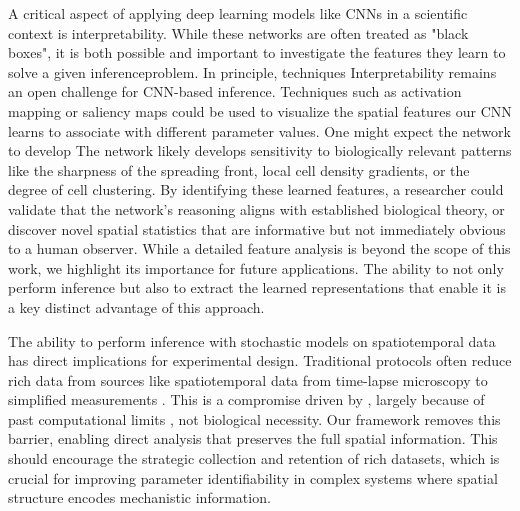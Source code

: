 \documentclass{article}
\providecommand{\DIFaddtex}[1]{{\protect\color{blue} \sf #1}} %
\providecommand{\DIFdeltex}[1]{{\protect\color{red} \scriptsize #1}} %
\providecommand{\DIFaddbegin}{} %
\providecommand{\DIFaddend}{} %
\providecommand{\DIFdelbegin}{} %
\providecommand{\DIFdelend}{} %
\providecommand{\DIFadd}[1]{\texorpdfstring{\DIFaddtex{#1}}{#1}} %
\providecommand{\DIFdel}[1]{\texorpdfstring{\DIFdeltex{#1}}{}} %
\newcommand{\DIFscaledelfig}{0.5}
\newlength{\DIFdelgraphicswidth} %
\newlength{\DIFdelgraphicsheight} %
\newcommand{\DIFaddincludegraphics}[2][]{{\color{blue}\fbox{\DIFOincludegraphics[#1]{#2}}}} %
\newcommand{\DIFdelincludegraphics}[2][]{%
\sbox{\DIFdelgraphicsbox}{\DIFOincludegraphics[#1]{#2}}%
\settoboxwidth{\DIFdelgraphicswidth}{\DIFdelgraphicsbox} %
\settoboxtotalheight{\DIFdelgraphicsheight}{\DIFdelgraphicsbox} %
\scalebox{\DIFscaledelfig}{%
\parbox[b]{\DIFdelgraphicswidth}{\usebox{\DIFdelgraphicsbox}\\[-\baselineskip] \rule{\DIFdelgraphicswidth}{0em}}\llap{\resizebox{\DIFdelgraphicswidth}{\DIFdelgraphicsheight}{%
\setlength{\unitlength}{\DIFdelgraphicswidth}%
\begin{picture}(1,1)%
\thicklines\linethickness{2pt} %
{\color[rgb]{1,0,0}\put(0,0){\framebox(1,1){}}}%
{\color[rgb]{1,0,0}\put(0,0){\line( 1,1){1}}}%
{\color[rgb]{1,0,0}\put(0,1){\line(1,-1){1}}}%
\end{picture}%
}\hspace*{3pt}}} %
} %
\DeclareRobustCommand{\DIFaddbegin}{\DIFOaddbegin \let\includegraphics\DIFaddincludegraphics} %
\DeclareRobustCommand{\DIFaddend}{\DIFOaddend \let\includegraphics\DIFOincludegraphics} %
\DeclareRobustCommand{\DIFdelbegin}{\DIFOdelbegin \let\includegraphics\DIFdelincludegraphics} %
\DeclareRobustCommand{\DIFdelend}{\DIFOaddend \let\includegraphics\DIFOincludegraphics} %
\begin{document}
\DIFdelbegin \DIFdel{A critical aspect of applying deep learning models like CNNs in a scientific context is interpretability. While these networks are often treated as "black boxes", it is both possible and important to investigate the features they learn to solve a given inferenceproblem. In principle, techniques }\DIFdelend \DIFaddbegin \DIFadd{Interpretability remains an open challenge for CNN-based inference. Techniques }\DIFaddend such as activation mapping \cite{2023arXiv230914304M} or saliency maps \citep{2019arXiv191111293M} could \DIFdelbegin \DIFdel{be used to }\DIFdelend visualize the spatial features our CNN learns to associate with different parameter values. \DIFdelbegin \DIFdel{One might expect the network to develop }\DIFdelend \DIFaddbegin \DIFadd{The network likely develops }\DIFaddend sensitivity to biologically relevant patterns like the sharpness of the spreading front, local cell density gradients, or the degree of cell clustering. By identifying these learned features, a researcher could validate that the network's reasoning aligns with established biological theory, or discover novel spatial statistics that are informative but not immediately obvious to a human observer. While a detailed feature analysis is beyond the scope of this work, we highlight its importance for future applications. The ability to not only perform inference but also to extract the learned representations that enable it is a \DIFdelbegin \DIFdel{key }\DIFdelend \DIFaddbegin \DIFadd{distinct }\DIFaddend advantage of this approach.

The ability to perform inference with stochastic models on spatiotemporal data has direct implications for experimental design. Traditional protocols often reduce \DIFdelbegin \DIFdel{rich data from sources like }\DIFdelend \DIFaddbegin \DIFadd{spatiotemporal data from }\DIFaddend time-lapse microscopy to simplified measurements\DIFdelbegin \DIFdel{. This is a compromise driven by }\DIFdelend \DIFaddbegin \DIFadd{, largely because of }\DIFaddend past computational limits\DIFdelbegin \DIFdel{, not biological necessity}\DIFdelend . Our framework removes this barrier, enabling direct analysis that preserves the full spatial information. This should encourage the strategic collection and retention of rich datasets, which is crucial for improving parameter identifiability in complex systems where spatial structure encodes mechanistic information.

\DIFdelbegin %
\end{document}
